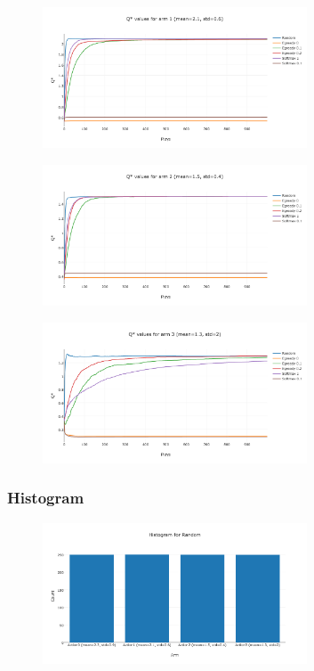 \documentclass[11pt]{article}
\begin{document}
\begin{figure}[H]
   \centering
   \includegraphics[width=0.7\textwidth]{img/1-1/q2.png}
\end{figure}

\begin{figure}[H]
   \centering
   \includegraphics[width=0.7\textwidth]{img/1-1/q3.png}
\end{figure}


\begin{figure}[H]
   \centering
   \includegraphics[width=0.7\textwidth]{img/1-1/q4.png}
\end{figure}


\subsubsection{Histogram}

\begin{figure}[H]
   \centering
   \includegraphics[width=0.7\textwidth]{img/1-1/h1.png}
\end{figure}
\end{document}
